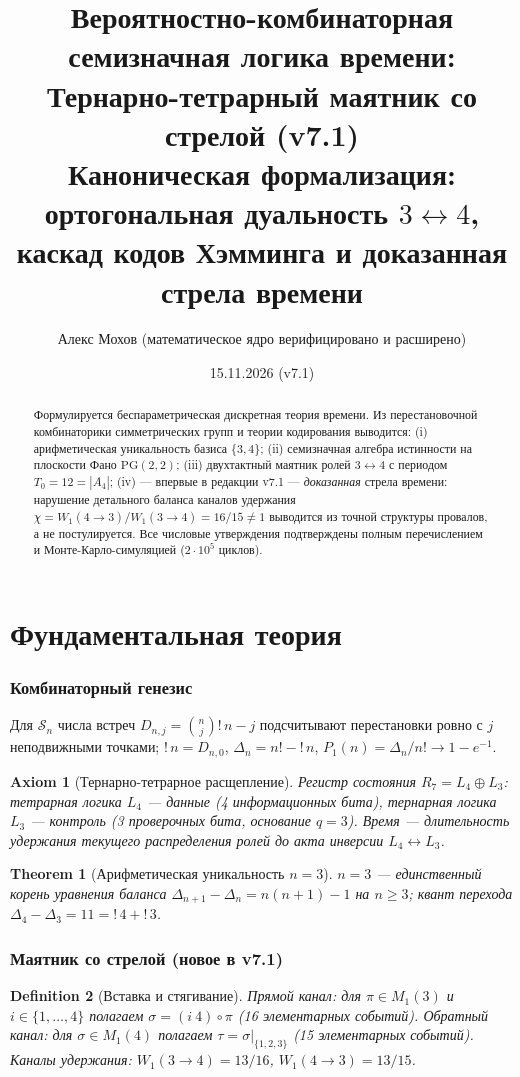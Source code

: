 \documentclass[11pt,a4paper]{article}
\title{\textbf{Вероятностно-комбинаторная семизначная логика времени:\\
Тернарно-тетрарный маятник со стрелой (v7.1)}\\
\large Каноническая формализация: ортогональная дуальность $3 \leftrightarrow 4$,
каскад кодов Хэмминга и доказанная стрела времени}
\author{Алекс Мохов (математическое ядро верифицировано и расширено)}
\date{15.11.2026 (v7.1)}
\newtheorem{theorem}{Theorem}[section]
\newtheorem{definition}[theorem]{Definition}
\newtheorem{axiom}{Axiom}[section]
\newcommand{\subfact}{\mathord{!}\,}
\newcommand{\Sgr}{\mathcal{S}}
\begin{document}
\maketitle

\begin{abstract}
Формулируется беспараметрическая дискретная теория времени. Из перестановочной
комбинаторики симметрических групп и теории кодирования выводится: (i)
арифметическая уникальность базиса $\{3,4\}$; (ii) семизначная алгебра истинности
на плоскости Фано $\mathrm{PG}(2,2)$; (iii) двухтактный маятник ролей
$3 \leftrightarrow 4$ с периодом $T_0 = 12 = |A_4|$; (iv) --- впервые в редакции
v7.1 --- \emph{доказанная} стрела времени: нарушение детального баланса каналов
удержания $\chi = W_1(4 \to 3)/W_1(3 \to 4) = 16/15 \neq 1$ выводится из точной
структуры провалов, а не постулируется. Все числовые утверждения подтверждены
полным перечислением и Монте-Карло-симуляцией ($2\cdot10^5$ циклов).
\end{abstract}

\part{Фундаментальная теория}

\section{Комбинаторный генезис}
Для $\Sgr_n$ числа встреч $D_{n,j} = \binom{n}{j}\subfact{n-j}$ подсчитывают
перестановки ровно с $j$ неподвижными точками; $\subfact{n} = D_{n,0}$,
$\Delta_n = n! - \subfact{n}$, $P_1(n) = \Delta_n/n! \to 1 - e^{-1}$.

\begin{axiom}[Тернарно-тетрарное расщепление]
Регистр состояния $R_7 = L_4 \oplus L_3$: тетрарная логика $L_4$ — данные
(4 информационных бита), тернарная логика $L_3$ — контроль (3 проверочных бита,
основание $q = 3$). Время — длительность удержания текущего распределения ролей
до акта инверсии $L_4 \leftrightarrow L_3$.
\end{axiom}

\begin{theorem}[Арифметическая уникальность $n = 3$]
$n = 3$ — единственный корень уравнения баланса
$\Delta_{n+1} - \Delta_n = n(n+1) - 1$ на $n \ge 3$; квант перехода
$\Delta_4 - \Delta_3 = 11 = \subfact{4} + \subfact{3}$.
\end{theorem}

\section{Маятник со стрелой (новое в v7.1)}
\begin{definition}[Вставка и стягивание]
Прямой канал: для $\pi \in M_1(3)$ и $i \in \{1,\dots,4\}$ полагаем
$\sigma = (i\ 4) \circ \pi$ (16 элементарных событий).
Обратный канал: для $\sigma \in M_1(4)$ полагаем $\tau = \sigma|_{\{1,2,3\}}$
(15 элементарных событий). Каналы удержания:
$W_1(3 \to 4) = 13/16$, $W_1(4 \to 3) = 13/15$.
\end{definition}
\end{document}
